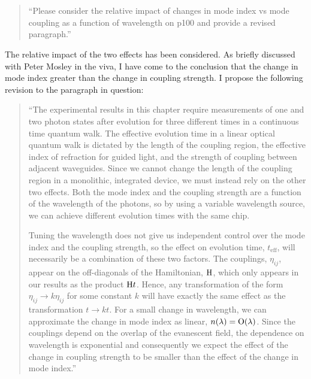 \documentclass[a4paper,11pt]{article}
\begin{document}
\section{}
\begin{quote}
  ``Please consider the relative impact of changes in mode index vs
  mode coupling as a function of wavelength on p100 and provide a
  revised paragraph.''
\end{quote}
The relative impact of the two effects has been considered. As briefly discussed
with Peter Mosley in the viva, I have come to the conclusion that the change in
mode index greater than the change in coupling strength. I propose the following
revision to the paragraph in question:
\begin{quote}
  ``The experimental results in this chapter require measurements of one and two
  photon states after evolution for three different times in a continuous time
  quantum walk. The effective evolution time in a linear optical quantum walk is
  dictated by the length of the coupling region, the effective index of
  refraction for guided light, and the strength of coupling between adjacent
  waveguides. Since we cannot change the length of the coupling region in a
  monolithic, integrated device, we must instead rely on the other two effects.
  Both the mode index and the coupling strength are a function of the wavelength
  of the photons, so by using a variable wavelength source, we can achieve
  different evolution times with the same chip.

  Tuning the wavelength does not give us independent control over the mode index
  and the coupling strength, so the effect on evolution time,
  \(t_{\text{eff}}\), will necessarily be a combination of these two factors.
  The couplings, \(\eta_{ij}\), appear on the off-diagonals of the Hamiltonian,
  \(\mathrm{H}\), which only appears in our results as the product \(\mathrm{H} t\).
  Hence, any transformation of the form \(\eta_{ij} \rightarrow k \eta_{ij}\)
  for some constant \(k\) will have exactly the same effect as the
  transformation \(t \rightarrow k t\). For a small change in wavelength, we
  can approximate the change in mode index as linear, \(n \!\left(\lambda\right) = \mathrm{O}
  \!\left(\lambda\right)\). Since the couplings depend on the overlap of the evanescent
  field, the dependence on wavelength is exponential and consequently we expect
  the effect of the change in coupling strength to be smaller than the effect of
  the change in mode index.''
\end{quote}
\end{document}
